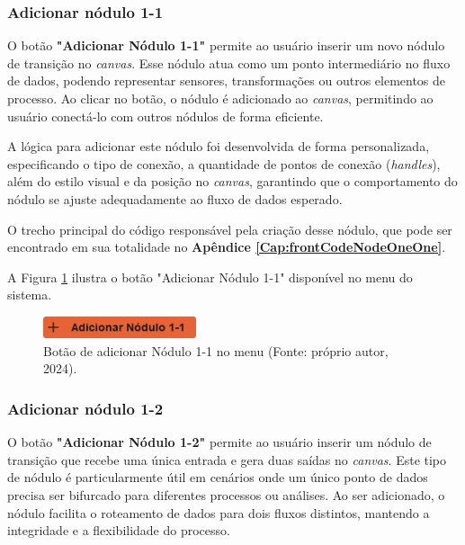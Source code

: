 \subsubsection{Adicionar nódulo 1-1}

O botão \textbf{"Adicionar Nódulo 1-1"} permite ao usuário inserir um novo nódulo de transição no \textit{canvas}. Esse nódulo atua como um ponto intermediário no fluxo de dados, podendo representar sensores, transformações ou outros elementos de processo. Ao clicar no botão, o nódulo é adicionado ao \textit{canvas}, permitindo ao usuário conectá-lo com outros nódulos de forma eficiente.

A lógica para adicionar este nódulo foi desenvolvida de forma personalizada, especificando o tipo de conexão, a quantidade de pontos de conexão (\textit{handles}), além do estilo visual e da posição no \textit{canvas}, garantindo que o comportamento do nódulo se ajuste adequadamente ao fluxo de dados esperado.

O trecho principal do código responsável pela criação desse nódulo, que pode ser encontrado em sua totalidade no \textbf{Apêndice \ref{Cap:frontCodeNodeOneOne}}.

A Figura \ref{Fig:AddNodeOneOneButton} ilustra o botão "Adicionar Nódulo 1-1" disponível no menu do sistema.

\begin{figure}[htbp]
    \centering
    \includegraphics[width=0.4\textwidth]{figuras/add-node11-button.png}
    \caption{Botão de adicionar Nódulo 1-1 no menu (Fonte: próprio autor, 2024).}
    \label{Fig:AddNodeOneOneButton}
\end{figure}


\subsubsection{Adicionar nódulo 1-2}

O botão \textbf{"Adicionar Nódulo 1-2"} permite ao usuário inserir um nódulo de transição que recebe uma única entrada e gera duas saídas no \textit{canvas}. Este tipo de nódulo é particularmente útil em cenários onde um único ponto de dados precisa ser bifurcado para diferentes processos ou análises. Ao ser adicionado, o nódulo facilita o roteamento de dados para dois fluxos distintos, mantendo a integridade e a flexibilidade do processo.

